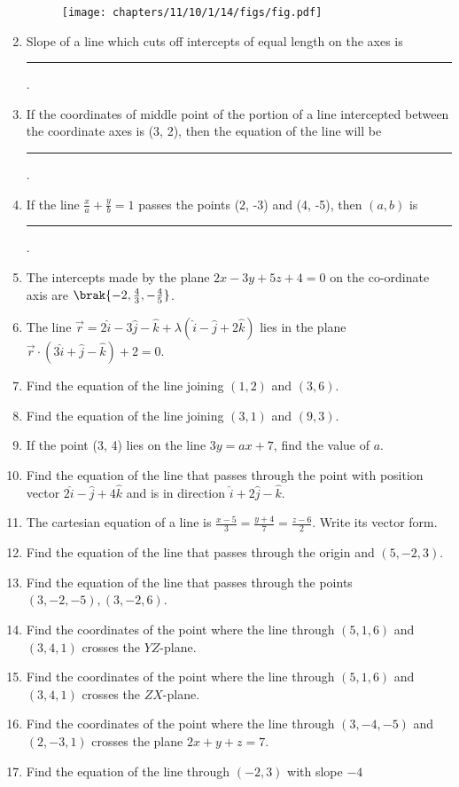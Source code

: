 \begin{enumerate}[label=\thesubsection.\arabic*, ref=\thesubsection.\theenumi]
\begin{figure}[H]
\centering
\texttt{[image: chapters/11/10/1/14/figs/fig.pdf]}
\caption{}
\label{fig:chapters/11/10/1/14/1}
\end{figure}
\solution

\item Slope of a line which cuts off intercepts of equal length on the axes is 
	\rule{1cm}{0.1pt}.
\item If the coordinates of middle point of the portion of a line intercepted between the coordinate axes is (3, 2), then the equation of the line will be
\rule{1cm}{0.1pt}.
\item If the line $\frac{x}{a}+\frac{y}{b}=1$ passes the points (2, -3) and (4, -5),  then $(a, b)$ is 
\rule{1cm}{0.1pt}.
\item The intercepts made by the plane $2x-3y+5z+4=0$ on the co-ordinate axis are $\brak{-2, \frac{4}{3}, -\frac{4}{5}}$.
\item The line $\overrightarrow{r}=2\hat{i}-3\hat{j}-\hat{k}+\lambda(\hat{i}-\hat{j}+2\hat{k})$ lies in the plane $\overrightarrow{r} \cdot (3\hat{i}+\hat{j}-\hat{k})+2=0$.
\item Find the equation of the line joining $(1, 2)$ and $(3, 6)$.
\item Find the equation of the line joining $(3, 1)$ and $(9, 3)$.
\item If the point (3,  4) lies on the line $3y=ax+7$,  find the value of $a$.
\item  Find the equation of the line that passes through the point with position vector $2\hat{i}-\hat{j}+4\hat{k}$ and is in direction $\hat{i}+2\hat{j}-\hat{k}$.
\item The cartesian equation of a line is $ \frac{x-5}{3}=\frac{y+4}{7}=\frac{z-6}{2}$. Write its vector form.
\item Find the equation of the line that passes through the origin and $(5, -2, 3)$.
\item Find the equation of the line that passes through the points $(3, -2, -5), (3, -2, 6)$.
\item Find the coordinates of the point where the line through $(5,1,6)$ and $(3,4,1)$ crosses the $YZ$-plane.
\item Find the coordinates of the point where the line through $(5,1,6)$ and $(3,4,1)$ crosses the $ZX$-plane.
\item Find the coordinates of the point where the line through $(3,-4,-5)$ and $(2,-3,1)$ crosses the plane $2x+y+z=7$.
\item Find the equation of the line through $(-2,3)$ with slope $-4$

\end{enumerate}
